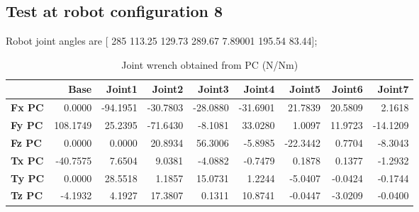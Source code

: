 
\subsection{Test at robot configuration 8}
Robot joint angles are  [ 285        113.25        129.73        289.67       7.89001        195.54         83.44];

\begin{table}[h!]
	\centering
	\caption{Joint wrench obtained from PC (N/Nm)}
	\label{wrech_PC_Pose8}
	\begin{tabular}{|l|r|r|r|r|r|r|r|r|}
		\hline
		\textbf{}  & \textbf{Base} & \textbf{Joint1}  & \textbf{Joint2}  & \textbf{Joint3}  & \textbf{Joint4}  & \textbf{Joint5}  & \textbf{Joint6}  & \textbf{Joint7} \\ \hline
		\textbf{Fx PC}  & 0.0000        & -94.1951        & -30.7803        & -28.0880        & -31.6901        & 21.7839        & 20.5809        & 2.1618 \\ \hline
		\textbf{Fy PC}  & 108.1749        & 25.2395        & -71.6430        & -8.1081        & 33.0280        & 1.0097        & 11.9723        & -14.1209 \\ \hline
		\textbf{Fz PC}  & 0.0000        & 0.0000        & 20.8934        & 56.3006        & -5.8985        & -22.3442        & 0.7704        & -8.3043 \\ \hline
		\textbf{Tx PC}  & -40.7575        & 7.6504        & 9.0381        & -4.0882        & -0.7479        & 0.1878        & 0.1377        & -1.2932 \\ \hline
		\textbf{Ty PC}  & 0.0000        & 28.5518        & 1.1857        & 15.0731        & 1.2244        & -5.0407        & -0.0424        & -0.1744 \\ \hline
		\textbf{Tz PC}  & -4.1932        & 4.1927        & 17.3807        & 0.1311        & 10.8741        & -0.0447        & -3.0209        & -0.0400 \\ \hline
	\end{tabular}
\end{table}

